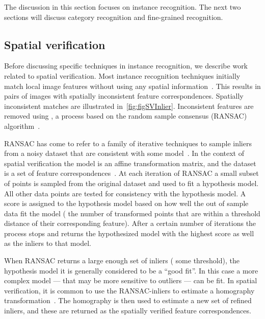     The discussion in this section focuses on instance recognition.
    The next two sections will discuss category recognition and fine-grained recognition.

    \subsection{Spatial verification}\label{subsec:sverreview}
        Before discussing specific techniques in instance recognition, we describe work related to spatial
        verification. Most instance recognition techniques initially match local image features without using any
        spatial information~\cite{lowe_distinctive_2004, sivic_efficient_2009, philbin_object_2007,
        tolias_image_2015}. This results in pairs of images with spatially inconsistent feature correspondences.
        Spatially inconsistent matches are illustrated in~\cref{fig:figSVInlier}. Inconsistent features are removed
        using , a process based on the random sample consensus (RANSAC)
        algorithm~\cite{fischler_random_1981}.

        RANSAC has come to refer to a family of iterative techniques to sample inliers from a noisy dataset that
        are consistent with some model~\cite{fischler_random_1981, hartley_multiple_2003, chum_locally_2003,
        raguram_usac_2013}. In the context of spatial verification the model is an affine transformation matrix,
        and the dataset is a set of feature correspondences~\cite{lowe_distinctive_2004, sivic_video_2003,
        philbin_object_2007, chum_total_2011, arandjelovic_three_2012}. At each iteration of RANSAC a small subset
        of points is sampled from the original dataset and used to fit a hypothesis model. All other data points
        are tested for consistency with the hypothesis model. A score is assigned to the hypothesis model based on
        how well the out of sample data fit the model (\eg{} the number of transformed points that are within a
        threshold distance of their corresponding feature). After a certain number of iterations the process stops
        and returns the hypothesized model with the highest score as well as the inliers to that model.

        When RANSAC returns a large enough set of inliers (\wrt{} some threshold), the hypothesis model it is
        generally considered to be a ``good fit''. In this case a more complex model --- that may be more sensitive
        to outliers --- can be fit. In spatial verification, it is common to use the RANSAC-inliers to estimate a
        homography transformation~\cite[311--320]{szeliski_computer_2010}. The homography is then used to estimate
        a new set of refined inliers, and these are returned as the spatially verified feature correspondences.

